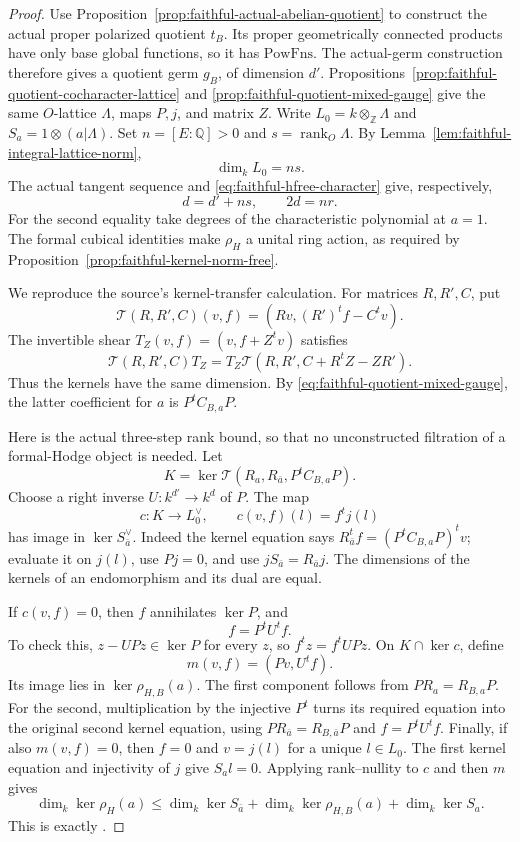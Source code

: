 \begin{proof}
Use Proposition~\ref{prop:faithful-actual-abelian-quotient}
to construct the actual proper polarized quotient \(t_B\).
Its proper geometrically connected products have only base
global functions, so it has \(\mathrm{PowFns}\).
The actual-germ construction therefore gives a quotient germ
\(g_B\), of dimension \(d'\).
Propositions~\ref{prop:faithful-quotient-cocharacter-lattice}
and \ref{prop:faithful-quotient-mixed-gauge} give the same
\(O\)-lattice \(\Lambda\), maps \(P,j\), and matrix \(Z\).
Write \(L_0=k\otimes_{\mathbb Z}\Lambda\) and
\(S_a=1\otimes(a|\Lambda)\).
Set \(n=[E:\mathbb Q]>0\) and
\(s=\operatorname{rank}_O\Lambda\).
By Lemma~\ref{lem:faithful-integral-lattice-norm},
\[
                  \dim_kL_0=ns.
\]
The actual tangent sequence and
\eqref{eq:faithful-hfree-character} give, respectively,
\[
                         d=d'+ns,\qquad 2d=nr.
 \tag{HF2}\label{eq:faithful-hfree-ranks}
\]
For the second equality take degrees of the characteristic
polynomial at \(a=1\).
The formal cubical identities make \(\rho_H\) a unital ring
action, as required by
Proposition~\ref{prop:faithful-kernel-norm-free}.

We reproduce the source's kernel-transfer calculation.
For matrices \(R,R',C\), put
\[
        \mathcal T(R,R',C)(v,f)=(Rv,(R')^tf-C^tv).
\]
The invertible shear \(T_Z(v,f)=(v,f+Z^tv)\) satisfies
\[
 \mathcal T(R,R',C)T_Z
        =T_Z\mathcal T(R,R',C+R^tZ-ZR').
\]
Thus the kernels have the same dimension.
By \eqref{eq:faithful-quotient-mixed-gauge}, the latter
coefficient for \(a\) is \(P^tC_{B,a}P\).

Here is the actual three-step rank bound, so that no
unconstructed filtration of a formal-Hodge object is needed.
Let
\[
             K=\ker\mathcal T(R_a,R_{\bar a},P^tC_{B,a}P).
\]
Choose a right inverse \(U:k^{d'}\to k^d\) of \(P\).
The map
\[
                   c:K\to L_0^\vee,\qquad
                        c(v,f)(l)=f^tj(l)
\]
has image in \(\ker S_{\bar a}^\vee\).
Indeed the kernel equation says
\(R_{\bar a}^tf=(P^tC_{B,a}P)^tv\);
evaluate it on \(j(l)\), use \(Pj=0\), and use
\(jS_{\bar a}=R_{\bar a}j\).
The dimensions of the kernels of an endomorphism and its
dual are equal.

If \(c(v,f)=0\), then \(f\) annihilates \(\ker P\), and
\[
                              f=P^tU^tf .
\]
To check this, \(z-UPz\in\ker P\) for every \(z\), so
\(f^tz=f^tUPz\).
On \(K\cap\ker c\), define
\[
                         m(v,f)=(Pv,U^tf).
\]
Its image lies in \(\ker\rho_{H,B}(a)\).
The first component follows from \(PR_a=R_{B,a}P\).
For the second, multiplication by the injective \(P^t\)
turns its required equation into the original second
kernel equation, using \(PR_{\bar a}=R_{B,\bar a}P\)
and \(f=P^tU^tf\).
Finally, if also \(m(v,f)=0\), then \(f=0\) and
\(v=j(l)\) for a unique \(l\in L_0\).
The first kernel equation and injectivity of \(j\) give
\(S_a l=0\).
Applying rank--nullity to \(c\) and then \(m\) gives
\[
 \dim_k\ker\rho_H(a)
 \le \dim_k\ker S_{\bar a}
       +\dim_k\ker\rho_{H,B}(a)+\dim_k\ker S_a .
 \tag{HF3}\label{eq:faithful-hfree-kernel-transfer}
\]
This is exactly .


\end{proof}

